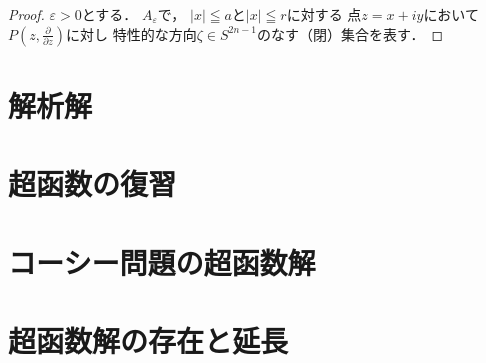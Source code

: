 \begin{proof}
    \(\varepsilon>0\)とする．
    \(A_{\varepsilon}\)で，
    \(\lvert x\rvert\leqq a\)と\(\lvert x\rvert\leqq r\)に対する
    点\(z=x+iy\)において\(P(z,\frac{\partial}{\partial z})\)に対し
    特性的な方向\(\zeta\in S^{2n-1}\)のなす（閉）集合を表す．
\end{proof}
\section{解析解}

\section{超函数の復習}

\section{コーシー問題の超函数解}

\section{超函数解の存在と延長}

